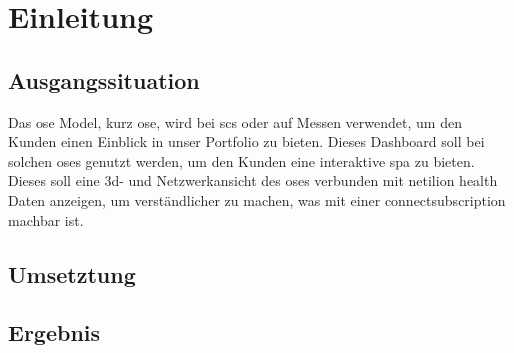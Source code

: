 \chapter{Einleitung}

\section{Ausgangssituation}

Das \acl{ose} Model, kurz \acs{ose}, wird bei \acfp{sc} oder auf Messen verwendet, um den Kunden einen Einblick in unser Portfolio zu bieten. Dieses Dashboard soll bei solchen \acsp{ose} genutzt werden, um den Kunden eine interaktive \acs{spa} zu bieten. Dieses soll eine 3d- und Netzwerkansicht des \acsp{ose} verbunden mit \acs{netilion} \acs{health} Daten anzeigen, um verständlicher zu machen, was mit einer \acs{connectsubscription} machbar ist.

\section{Umsetztung}

\lipsum[2-4][12-18]

\section{Ergebnis}

\lipsum[2-4][12-18]